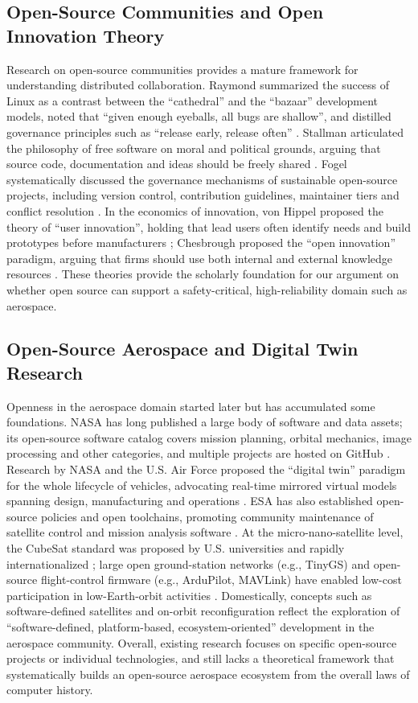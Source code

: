 \documentclass[11pt]{article}
\begin{document}
\subsection{Open-Source Communities and Open Innovation Theory}
Research on open-source communities provides a mature framework for understanding distributed collaboration. Raymond summarized the success of Linux as a contrast between the ``cathedral'' and the ``bazaar'' development models, noted that ``given enough eyeballs, all bugs are shallow'', and distilled governance principles such as ``release early, release often'' \cite{raymond1999}. Stallman articulated the philosophy of free software on moral and political grounds, arguing that source code, documentation and ideas should be freely shared \cite{stallman1985}. Fogel systematically discussed the governance mechanisms of sustainable open-source projects, including version control, contribution guidelines, maintainer tiers and conflict resolution \cite{fogel2005}. In the economics of innovation, von Hippel proposed the theory of ``user innovation'', holding that lead users often identify needs and build prototypes before manufacturers \cite{vonhippel2005}; Chesbrough proposed the ``open innovation'' paradigm, arguing that firms should use both internal and external knowledge resources \cite{chesbrough2003}. These theories provide the scholarly foundation for our argument on whether open source can support a safety-critical, high-reliability domain such as aerospace.

\subsection{Open-Source Aerospace and Digital Twin Research}
Openness in the aerospace domain started later but has accumulated some foundations. NASA has long published a large body of software and data assets; its open-source software catalog covers mission planning, orbital mechanics, image processing and other categories, and multiple projects are hosted on GitHub \cite{nasa}. Research by NASA and the U.S. Air Force proposed the ``digital twin'' paradigm for the whole lifecycle of vehicles, advocating real-time mirrored virtual models spanning design, manufacturing and operations \cite{glaessgen2012,grieves2017}. ESA has also established open-source policies and open toolchains, promoting community maintenance of satellite control and mission analysis software \cite{esa}. At the micro-nano-satellite level, the CubeSat standard was proposed by U.S. universities and rapidly internationalized \cite{puig2001}; large open ground-station networks (e.g., TinyGS) and open-source flight-control firmware (e.g., ArduPilot, MAVLink) have enabled low-cost participation in low-Earth-orbit activities \cite{tinygs,ardupilot,mavlink}. Domestically, concepts such as software-defined satellites and on-orbit reconfiguration \cite{xufanjiang2023} reflect the exploration of ``software-defined, platform-based, ecosystem-oriented'' development in the aerospace community. Overall, existing research focuses on specific open-source projects or individual technologies, and still lacks a theoretical framework that systematically builds an open-source aerospace ecosystem from the overall laws of computer history.
\end{document}
